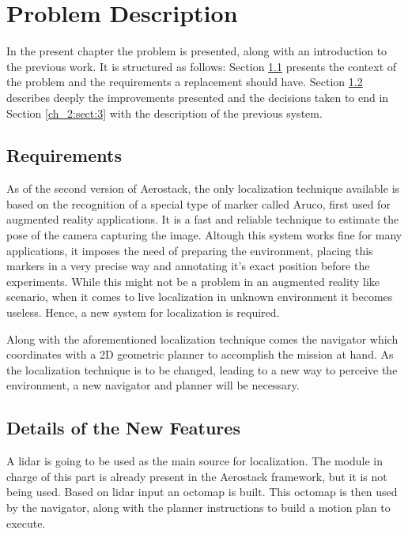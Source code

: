 \chapter{Problem Description}

  In the present chapter the problem is presented, along with an introduction to the previous work. It is structured as follows: Section \ref{ch_2:sect:1} presents the context of the problem and the requirements a replacement should have. Section \ref{ch_2:sect:2} describes deeply the improvements presented and the decisions taken to end in Section \ref{ch_2:sect:3} with the description of the previous system.

  \section{Requirements} \label{ch_2:sect:1}

    As of the second version of Aerostack, the only localization technique available is based on the recognition of a special type of marker called Aruco, first used for augmented reality applications. It is a fast and reliable technique to estimate the pose of the camera capturing the image. Altough this system works fine for many applications, it imposes the need of preparing the environment, placing this markers in a very precise way and annotating it's exact position before the experiments. While this might not be a problem in an augmented reality like scenario, when it comes to live localization in unknown environment it becomes useless. Hence, a new system for localization is required.

    Along with the aforementioned localization technique comes the navigator which coordinates with a 2D geometric planner to accomplish the mission at hand. As the localization technique is to be changed, leading to a new way to perceive the environment, a new navigator and planner will be necessary. 

  \section{Details of the New Features} \label{ch_2:sect:2}

    A lidar is going to be used as the main source for localization. The module in charge of this part is already present in the Aerostack framework, but it is not being used. Based on lidar input an octomap is built. This octomap is then used by the navigator, along with the planner instructions to build a motion plan to execute.

